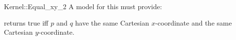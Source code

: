 \begin{ccRefFunctionObjectConcept}{Kernel::Equal_xy_2}
A model for this must provide:


{returns true iff $p$ and $q$ have the same Cartesian $x$-coordinate
and the same Cartesian $y$-coordinate.}

\end{ccRefFunctionObjectConcept}
